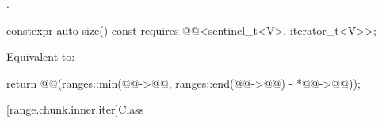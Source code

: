 \begin{itemdescr}
\pnum
\returns
{}.
\end{itemdescr}

\begin{itemdecl}
constexpr auto size() const
  requires @@<sentinel_t<V>, iterator_t<V>>;
\end{itemdecl}

\begin{itemdescr}
\pnum
\effects
Equivalent to:
\begin{codeblock}
return @@(ranges::min(@@->@@,
	                            ranges::end(@@->@@) - *@@->@@));
\end{codeblock}
\end{itemdescr}

[range.chunk.inner.iter]{Class }


